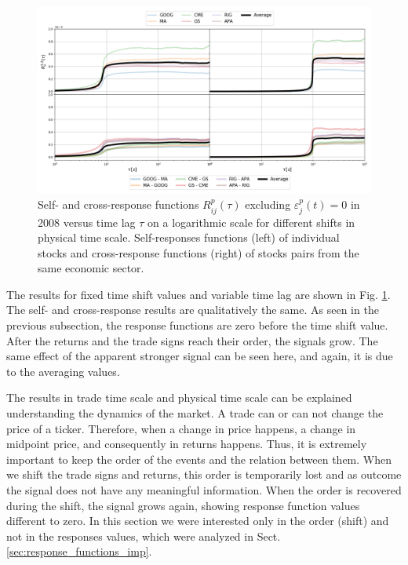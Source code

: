 \begin{figure}[htbp]
    \centering
    \includegraphics[width=\textwidth]{figures/04_shift_responses_physical.png}
    \caption{Self- and cross-response functions $R^{p}_{ij}\left(\tau\right)$
             excluding $\varepsilon^{p}_{j}\left(t\right) = 0$ in 2008 versus
             time lag $\tau$ on a logarithmic scale for different shifts in
             physical time scale. Self-responses functions (left) of individual
             stocks and cross-response functions (right) of stocks pairs from
             the same economic sector.}
    \label{fig:shift_responses_physical_scale}
\end{figure}

The results for fixed time shift values and variable time lag are shown in Fig.
\ref{fig:shift_responses_physical_scale}. The self- and cross-response results
are qualitatively the same. As seen in the previous subsection, the response
functions are zero before the time shift value. After the returns and the trade
signs reach their order, the signals grow. The same effect of the apparent
stronger signal can be seen here, and again, it is due to the averaging values.

The results in trade time scale and physical time scale can be explained
understanding the dynamics of the market. A trade can or can not change the
price of a ticker. Therefore, when a change in price happens, a change in
midpoint price, and consequently in returns happens. Thus, it is extremely
important to keep the order of the events and the relation between them. When
we shift the trade signs and returns, this order is temporarily lost and as
outcome the signal does not have any meaningful information. When the order is
recovered during the shift, the signal grows again, showing response function
values different to zero. In this section we were interested only in the order
(shift) and not in the responses values, which were analyzed in Sect.
\ref{sec:response_functions_imp}.

